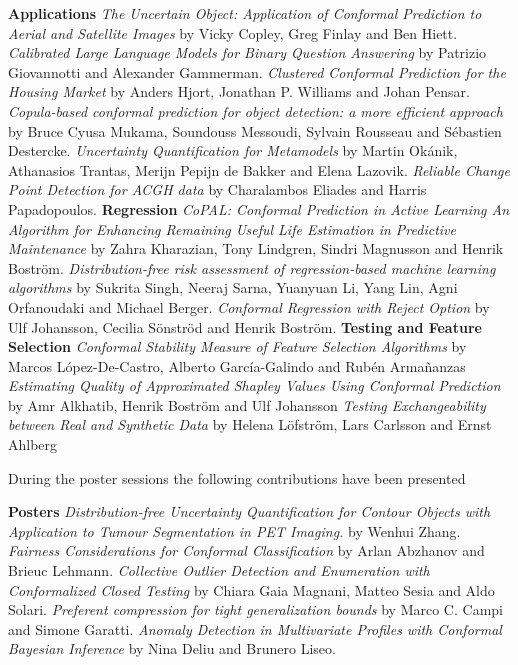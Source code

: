 \documentclass[twoside,11pt]{article}
\begin{document}
\begin{outline}
    \1\textbf{Applications}
        \2\emph{The Uncertain Object: Application of Conformal Prediction to Aerial and Satellite Images} by Vicky Copley, Greg Finlay and Ben Hiett.
        \2\emph{Calibrated Large Language Models for Binary Question Answering} by Patrizio Giovannotti and Alexander Gammerman.
        \2\emph{Clustered Conformal Prediction for the Housing Market} by Anders Hjort, Jonathan P. Williams and Johan Pensar.
        \2\emph{Copula-based conformal prediction for object detection: a more efficient approach} by Bruce Cyusa Mukama, Soundouss Messoudi, Sylvain Rousseau and Sébastien Destercke.
        \2\emph{Uncertainty Quantification for Metamodels} by Martin Okánik, Athanasios Trantas, Merijn Pepijn de Bakker and Elena Lazovik.
        \2\emph{Reliable Change Point Detection for ACGH data} by Charalambos Eliades and Harris Papadopoulos.
    \1\textbf{Regression}
        \2\emph{CoPAL: Conformal Prediction in Active Learning An Algorithm for Enhancing Remaining Useful Life Estimation in Predictive Maintenance} by Zahra Kharazian, Tony Lindgren, Sindri Magnusson and Henrik Boström.
        \2\emph{Distribution-free risk assessment of regression-based machine learning algorithms} by Sukrita Singh, Neeraj Sarna, Yuanyuan Li, Yang Lin, Agni Orfanoudaki and Michael Berger.
        \2\emph{Conformal Regression with Reject Option} by Ulf Johansson, Cecilia Sönströd and Henrik Boström.
    \1\textbf{Testing and Feature Selection}
        \2\emph{Conformal Stability Measure of Feature Selection Algorithms} by Marcos López-De-Castro, Alberto García-Galindo and Rubén Armañanzas
        \2\emph{Estimating Quality of Approximated Shapley Values Using Conformal Prediction} by Amr Alkhatib, Henrik Boström and Ulf Johansson
        \2\emph{Testing Exchangeability between Real and Synthetic Data} by Helena Löfström, Lars Carlsson and Ernst Ahlberg
        
\end{outline}

During the poster sessions the following contributions have been presented
\begin{outline}
    \1\textbf{Posters}
        \2\emph{Distribution-free Uncertainty Quantification for Contour Objects with Application  to Tumour Segmentation in PET Imaging.} by Wenhui Zhang.
        \2\emph{Fairness Considerations for Conformal Classification} by Arlan Abzhanov and Brieuc Lehmann.
        \2\emph{Collective Outlier Detection and Enumeration with Conformalized Closed Testing} by Chiara Gaia Magnani, Matteo Sesia and Aldo Solari.
        \2\emph{Preferent compression for tight generalization bounds} by Marco C. Campi and Simone Garatti.
        \2\emph{Anomaly Detection in Multivariate Profiles with Conformal Bayesian Inference} by Nina Deliu and Brunero Liseo.
\end{outline}
\end{document}
